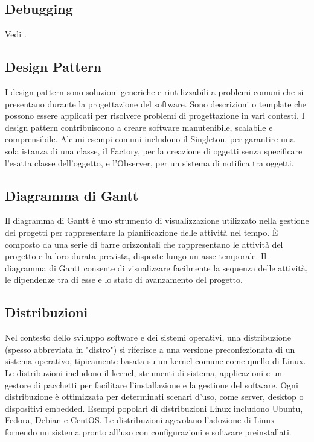 \vspace{2em}
\subsection*{Debugging}
\par Vedi .

\vspace{2em}
\subsection*{Design Pattern}
\par I design pattern sono soluzioni generiche e riutilizzabili a problemi comuni che si presentano durante la progettazione del software. Sono descrizioni o template che possono essere applicati per risolvere problemi di progettazione in vari contesti. I design pattern contribuiscono a creare software manutenibile, scalabile e comprensibile. Alcuni esempi comuni includono il Singleton, per garantire una sola istanza di una classe, il Factory, per la creazione di oggetti senza specificare l'esatta classe dell'oggetto, e l'Observer, per un sistema di notifica tra oggetti.

\vspace{2em}
\subsection*{Diagramma di Gantt}
\par Il diagramma di Gantt è uno strumento di visualizzazione utilizzato nella gestione dei progetti per rappresentare la pianificazione delle attività nel tempo. È composto da una serie di barre orizzontali che rappresentano le attività del progetto e la loro durata prevista, disposte lungo un asse temporale. Il diagramma di Gantt consente di visualizzare facilmente la sequenza delle attività, le dipendenze tra di esse e lo stato di avanzamento del progetto.

\vspace{2em}
\subsection*{Distribuzioni}
\par Nel contesto dello sviluppo software e dei sistemi operativi, una distribuzione (spesso abbreviata in "distro") si riferisce a una versione preconfezionata di un sistema operativo, tipicamente basata su un kernel comune come quello di Linux. Le distribuzioni includono il kernel, strumenti di sistema, applicazioni e un gestore di pacchetti per facilitare l'installazione e la gestione del software. Ogni distribuzione è ottimizzata per determinati scenari d'uso, come server, desktop o dispositivi embedded. Esempi popolari di distribuzioni Linux includono Ubuntu, Fedora, Debian e CentOS. Le distribuzioni agevolano l'adozione di Linux fornendo un sistema pronto all'uso con configurazioni e software preinstallati.

